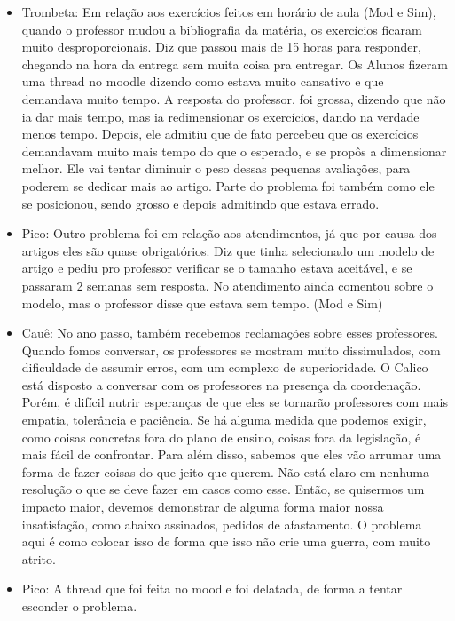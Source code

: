 \documentclass{ata-calico}
\begin{document}
\begin{itemize}
\item Trombeta: Em relação aos exercícios feitos em horário de aula (Mod e Sim), quando o professor mudou a bibliografia da matéria, os exercícios ficaram muito desproporcionais. Diz que passou mais de 15 horas para responder, chegando na hora da entrega sem muita coisa pra entregar. Os Alunos fizeram uma thread no moodle dizendo como estava muito cansativo e que demandava muito tempo. A resposta do professor. foi grossa, dizendo que não ia dar mais tempo, mas ia redimensionar os exercícios, dando na verdade menos tempo. Depois, ele admitiu que de fato percebeu que os exercícios demandavam muito mais tempo do que o esperado, e se propôs a dimensionar melhor. Ele vai tentar diminuir o peso dessas pequenas avaliações, para poderem se dedicar mais ao artigo. Parte do problema foi também como ele se posicionou, sendo grosso e depois admitindo que estava errado.

\item Pico: Outro problema foi em relação aos atendimentos, já que por causa dos artigos eles são quase obrigatórios. Diz que tinha selecionado um modelo de artigo e pediu pro professor verificar se o tamanho estava aceitável, e se passaram 2 semanas sem resposta. No atendimento ainda comentou sobre o modelo, mas o professor disse que estava sem tempo. (Mod e Sim) 

\item Cauê: No ano passo, também recebemos reclamações sobre esses professores. Quando fomos conversar, os professores se mostram muito dissimulados, com dificuldade de assumir erros, com um complexo de superioridade. O Calico está disposto a conversar com os professores na presença da coordenação. Porém, é difícil nutrir esperanças de que eles se tornarão professores com mais empatia, tolerância e paciência. Se há alguma medida que podemos exigir, como coisas concretas fora do plano de ensino, coisas fora da legislação, é mais fácil de confrontar. Para além disso, sabemos que eles vão arrumar uma forma de fazer coisas do que jeito que querem. Não está claro em nenhuma resolução o que se deve fazer em casos como esse. Então, se quisermos um impacto maior, devemos demonstrar de alguma forma maior nossa insatisfação, como abaixo assinados, pedidos de afastamento. O problema aqui é como colocar isso de forma que isso não crie uma guerra, com muito atrito.

\item Pico: A thread que foi feita no moodle foi delatada, de forma a tentar esconder o problema.


\end{itemize}
\end{document}

